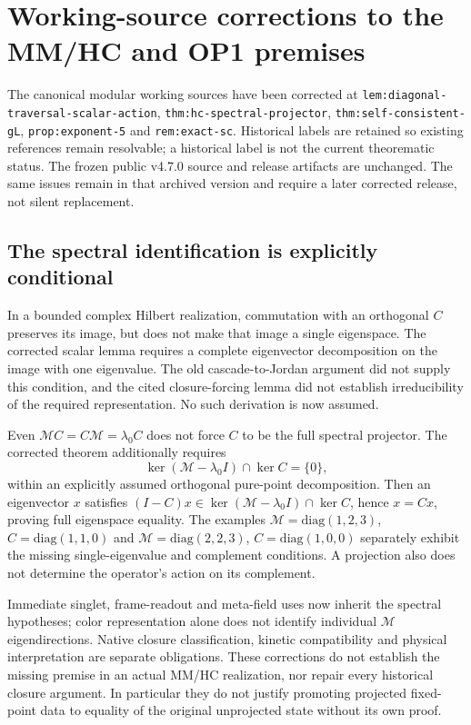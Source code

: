 \documentclass[11pt,a4paper]{article}
\begin{document}
\section{Working-source corrections to the MM/HC and OP1 premises}
\label{sec:mm-hc-exponent-source-corrections}

The canonical modular working sources have been corrected at
\texttt{lem:diagonal-traversal-scalar-action},
\texttt{thm:hc-spectral-projector},
\texttt{thm:self-consistent-gL}, \texttt{prop:exponent-5} and
\texttt{rem:exact-sc}. Historical labels are retained so existing
references remain resolvable; a historical label is not the current
theorematic status. The frozen public v4.7.0 source and release
artifacts are unchanged. The same issues remain in that archived
version and require a later corrected release, not silent replacement.

\subsection{The spectral identification is explicitly conditional}

In a bounded complex Hilbert realization, commutation with an
orthogonal $C$ preserves its image, but does not make that image
a single eigenspace. The corrected scalar lemma requires a complete
eigenvector decomposition on the image with one eigenvalue.
The old cascade-to-Jordan argument did not supply this condition,
and the cited closure-forcing lemma did not establish irreducibility
of the required representation. No such derivation is now assumed.

Even $\mathcal MC=C\mathcal M=\lambda_0 C$ does not force $C$
to be the full spectral projector. The corrected theorem additionally
requires
\[
 \ker(\mathcal M-\lambda_0 I)\cap\ker C=\{0\},
\]
within an explicitly assumed orthogonal pure-point decomposition.
Then an eigenvector $x$ satisfies
$(I-C)x\in\ker(\mathcal M-\lambda_0 I)\cap\ker C$, hence
$x=Cx$, proving full eigenspace equality. The examples
$\mathcal M=\mathrm{diag}(1,2,3)$, $C=\mathrm{diag}(1,1,0)$ and
$\mathcal M=\mathrm{diag}(2,2,3)$, $C=\mathrm{diag}(1,0,0)$
separately exhibit the missing single-eigenvalue and complement
conditions. A projection also does not determine the operator's
action on its complement.

Immediate singlet, frame-readout and meta-field uses now inherit
the spectral hypotheses; color representation alone does not
identify individual $\mathcal M$ eigendirections. Native closure
classification, kinetic compatibility and physical interpretation
are separate obligations. These corrections do not establish the
missing premise in an actual MM/HC realization, nor repair every
historical closure argument. In particular they do not justify
promoting projected fixed-point data to equality of the original
unprojected state without its own proof.
\end{document}
